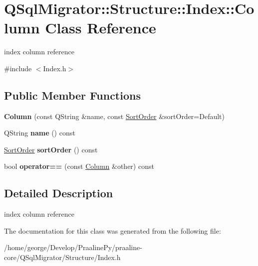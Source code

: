 \hypertarget{class_q_sql_migrator_1_1_structure_1_1_index_1_1_column}{}\section{Q\+Sql\+Migrator\+:\+:Structure\+:\+:Index\+:\+:Column Class Reference}
\label{class_q_sql_migrator_1_1_structure_1_1_index_1_1_column}


index column reference  




{\ttfamily \#include $<$Index.\+h$>$}

\subsection*{Public Member Functions}
\begin{DoxyCompactItemize}
\item 
\mbox{\label{class_q_sql_migrator_1_1_structure_1_1_index_1_1_column_afe48cf548cec5df9d6e6d6ab2dacb613}} 
{\bfseries Column} (const Q\+String \&name, const \hyperlink{class_q_sql_migrator_1_1_structure_1_1_index_a237ef125893ca00672374a7fb3cff687}{Sort\+Order} \&sort\+Order=Default)
\item 
\mbox{\label{class_q_sql_migrator_1_1_structure_1_1_index_1_1_column_a0143d99e2abfd3d5c4eaa7d81a9790ab}} 
Q\+String {\bfseries name} () const
\item 
\mbox{\label{class_q_sql_migrator_1_1_structure_1_1_index_1_1_column_a16e7aa7bc74273750a2b422c8cd3abce}} 
\hyperlink{class_q_sql_migrator_1_1_structure_1_1_index_a237ef125893ca00672374a7fb3cff687}{Sort\+Order} {\bfseries sort\+Order} () const
\item 
\mbox{\label{class_q_sql_migrator_1_1_structure_1_1_index_1_1_column_a113581904a9f74bbdd9154da5ad5b67e}} 
bool {\bfseries operator==} (const \hyperlink{class_q_sql_migrator_1_1_structure_1_1_index_1_1_column}{Column} \&other) const
\end{DoxyCompactItemize}


\subsection{Detailed Description}
index column reference 

The documentation for this class was generated from the following file\+:\begin{DoxyCompactItemize}
\item 
/home/george/\+Develop/\+Praaline\+Py/praaline-\/core/\+Q\+Sql\+Migrator/\+Structure/Index.\+h\end{DoxyCompactItemize}
